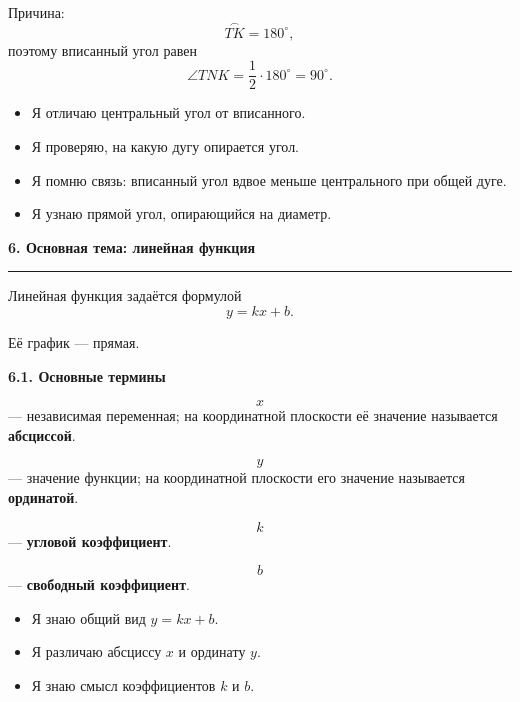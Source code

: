 \documentclass[a4paper,12pt]{article}
\newcommand{\topic}[1]{%
  \vspace{0.4em}
  {\Large\bfseries\color{darkaccent}#1\par}
  \vspace{0.25em}
  {\color{accent}\rule{\linewidth}{0.7pt}}
  \vspace{0.45em}
}
\newcommand{\subtopic}[1]{%
  \vspace{0.5em}
  {\large\bfseries\color{darkaccent}#1\par}
  \vspace{0.2em}
}
\newcommand{\checkliststart}{%
  \begin{itemize}[label={\(\square\)},leftmargin=8mm]
}
\newcommand{\checklistend}{\end{itemize}}
\begin{document}
\begin{center}
\end{center}

Причина:
\[
\overset{\frown}{TK}=180^\circ,
\]
поэтому вписанный угол равен
\[
\angle TNK
=
\frac12\cdot180^\circ
=
90^\circ.
\]

\checkliststart
\item Я отличаю центральный угол от вписанного.
\item Я проверяю, на какую дугу опирается угол.
\item Я помню связь: вписанный угол вдвое меньше центрального при общей дуге.
\item Я узнаю прямой угол, опирающийся на диаметр.
\checklistend

\topic{6. Основная тема: линейная функция}

Линейная функция задаётся формулой
\[
\boxed{y=kx+b}.
\]

Её график --- прямая.

\subtopic{6.1. Основные термины}

\[
x
\]
--- независимая переменная; на координатной плоскости её значение называется \textbf{абсциссой}.

\[
y
\]
--- значение функции; на координатной плоскости его значение называется \textbf{ординатой}.

\[
k
\]
--- \textbf{угловой коэффициент}.

\[
b
\]
--- \textbf{свободный коэффициент}.

\checkliststart
\item Я знаю общий вид \(y=kx+b\).
\item Я различаю абсциссу \(x\) и ординату \(y\).
\item Я знаю смысл коэффициентов \(k\) и \(b\).
\checklistend
\end{document}
